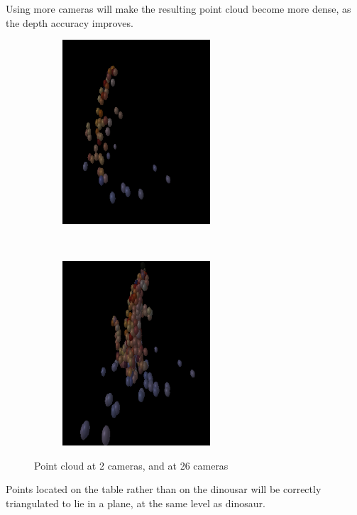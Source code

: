 Using more cameras will make the resulting point cloud become more dense, as the depth accuracy improves.

\begin{figure}[htb]
	\centering
	\begin{subfigure}[b]{0.3\textwidth}
		\includegraphics[width=55mm]{images/2_2_small.png}
	\end{subfigure}
	~ ~ ~
	\begin{subfigure}[b]{0.3\textwidth}
		\includegraphics[width=55mm]{images/26_2_small.png}
	\end{subfigure}
	\caption{Point cloud at 2 cameras, and at 26 cameras}
	\label{fig:CANHASDUALIMAGE}  %
\end{figure}

Points located on the table rather than on the dinousar will be correctly triangulated to lie in a plane, at the same level as dinosaur.

